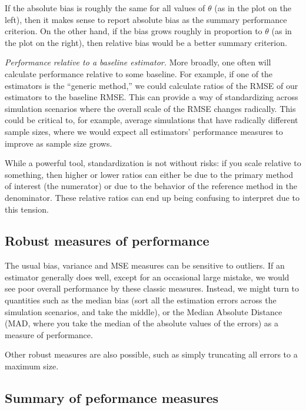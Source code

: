 \documentclass[
]{book}
\begin{document}
If the absolute bias is roughly the same for all values of \(\theta\) (as in the plot on the left), then it makes sense to report absolute bias as the summary performance criterion.
On the other hand, if the bias grows roughly in proportion to \(\theta\) (as in the plot on the right), then relative bias would be a better summary criterion.

\emph{Performance relative to a baseline estimator.}
More broadly, one often will calculate performance relative to some baseline.
For example, if one of the estimators is the ``generic method,'' we could calculate ratios of the RMSE of our estimators to the baseline RMSE.
This can provide a way of standardizing across simulation scenarios where the overall scale of the RMSE changes radically.
This could be critical to, for example, average simulations that have radically different sample sizes, where we would expect all estimators' performance measures to improve as sample size grows.

While a powerful tool, standardization is not without risks: if you scale relative to something, then higher or lower ratios can either be due to the primary method of interest (the numerator) or due to the behavior of the reference method in the denominator.
These relative ratios can end up being confusing to interpret due to this tension.

\hypertarget{robust-measures-of-performance}{%
\subsection{Robust measures of performance}\label{robust-measures-of-performance}}

The usual bias, variance and MSE measures can be sensitive to outliers.
If an estimator generally does well, except for an occasional large mistake, we would see poor overall performance by these classic measures.
Instead, we might turn to quantities such as the median bias (sort all the estimation errors across the simulation scenarios, and take the middle), or the Median Absolute Distance (MAD, where you take the median of the absolute values of the errors) as a measure of performance.

Other robust measures are also possible, such as simply truncating all errors to a maximum size.

\hypertarget{summary-of-peformance-measures}{%
\subsection{Summary of peformance measures}\label{summary-of-peformance-measures}}
\end{document}
